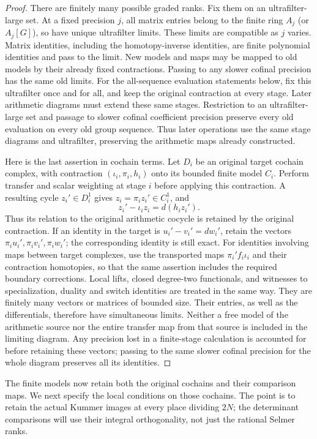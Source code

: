 \begin{proof}
There are finitely many possible graded ranks.  Fix them on an
ultrafilter-large set.  At a fixed precision $j$, all matrix entries belong
to the finite ring $A_j$ (or $A_j[G]$), so have unique ultrafilter limits.
These limits are compatible as $j$ varies.  Matrix identities, including
the homotopy-inverse identities, are finite polynomial identities and pass
to the limit.  New models and maps may be mapped to old models by their
already fixed contractions.  Passing to any slower cofinal precision has
the same old limits.  For the all-sequence evaluation statements below,
fix this ultrafilter once and for all, and keep the original contraction
at every stage.  Later arithmetic diagrams must extend these same
stages.  Restriction to an ultrafilter-large set and passage to slower
cofinal coefficient precision preserve every old evaluation on every
old group sequence. Thus later operations use the same stage diagrams
and ultrafilter, preserving the arithmetic maps already constructed.

Here is the last assertion in cochain terms. Let $D_i$ be an original
target cochain complex, with contraction
$(\iota_i,\pi_i,h_i)$ onto its bounded finite model $C_i$.
Perform transfer and scalar weighting at stage $i$ before applying
this contraction. A resulting cycle $z_i'\in D_i^1$ gives
$z_i=\pi_i z_i'\in C_i^1$, and
\[
 z_i'-\iota_i z_i=d(h_i z_i').
\]
Thus its relation to the original arithmetic cocycle is retained by
the original contraction. If an identity in the target is
$u_i'-v_i'=d w_i'$, retain the vectors
$\pi_i u_i',\pi_i v_i',\pi_i w_i'$; the corresponding identity is
still exact. For identities involving maps between target complexes,
use the transported maps $\pi_i'f_i\iota_i$ and their contraction
homotopies, so that the same assertion includes the required boundary
corrections. Local lifts, closed degree-two functionals, and witnesses
to specialization, duality and switch identities are treated in the
same way. They are finitely many vectors or matrices of bounded size.
Their entries, as well as the differentials, therefore have simultaneous
limits. Neither a free model of the arithmetic source nor the entire
transfer map from that source is included in the limiting diagram.
Any precision lost in a finite-stage calculation is accounted for
before retaining these vectors; passing to the same slower cofinal
precision for the whole diagram preserves all its identities.
\end{proof}

The finite models now retain both the original cochains and their
comparison maps. We next specify the local conditions on those cochains.
The point is to retain the actual Kummer images at every place dividing $2N$;
the determinant comparisons will use their integral orthogonality, not
just the rational Selmer ranks.

